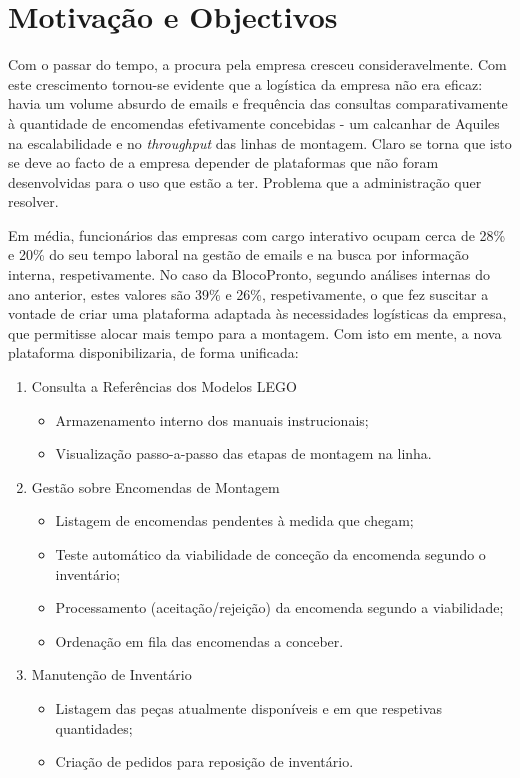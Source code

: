     \newpage
    \section{Motivação e Objectivos}
        
        Com o passar do tempo, a procura pela empresa cresceu consideravelmente. Com este crescimento tornou-se evidente que a logística da empresa não era eficaz: havia um volume absurdo de emails e frequência das consultas comparativamente à quantidade de encomendas efetivamente concebidas - um calcanhar de Aquiles na escalabilidade e no \textit{throughput} das linhas de montagem. Claro se torna que isto se deve ao facto de a empresa depender de plataformas que não foram desenvolvidas para o uso que estão a ter. Problema que a administração quer resolver.


        Em média, funcionários das empresas com cargo interativo ocupam cerca de 28\% e 20\% do seu tempo laboral na gestão de emails e na busca por informação interna, respetivamente\cite{Chui2012}. No caso da BlocoPronto, segundo análises internas do ano anterior, estes valores são 39\% e 26\%, respetivamente, o que fez suscitar a vontade de criar uma plataforma adaptada às necessidades logísticas da empresa, que permitisse alocar mais tempo para a montagem. Com isto em mente, a nova plataforma disponibilizaria, de forma unificada:

        \begin{enumerate}
            \item Consulta a Referências dos Modelos LEGO
            \begin{itemize}
                \item Armazenamento interno dos manuais instrucionais;
                \item Visualização passo-a-passo das etapas de montagem na linha.
            \end{itemize}

            \item Gestão sobre Encomendas de Montagem
            \begin{itemize}
                \item Listagem de encomendas pendentes à medida que chegam;
                \item Teste automático da viabilidade de conceção da encomenda segundo o inventário;
                \item Processamento (aceitação/rejeição) da encomenda segundo a viabilidade;
                \item Ordenação em fila das encomendas a conceber.
            \end{itemize}
        
            \item Manutenção de Inventário
            \begin{itemize}
                \item Listagem das peças atualmente disponíveis e em que respetivas quantidades;
                \item Criação de pedidos para reposição de inventário.
            \end{itemize}
        \end{enumerate}

